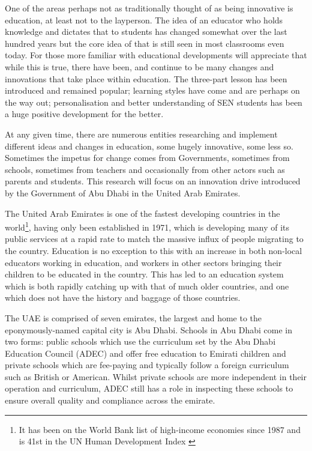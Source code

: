 One of the areas perhaps not as traditionally thought of as being innovative is education, at least not to the layperson. The idea of an educator who holds knowledge and dictates that to students has changed somewhat over the last hundred years but the core idea of that is still seen in most classrooms even today. For those more familiar with educational developments will appreciate that while this is true, there have been, and continue to be many changes and innovations that take place within education. The three-part lesson has been introduced and remained popular; learning styles have come and are perhaps on the way out; personalisation and better understanding of SEN students has been a huge positive development for the better.

At any given time, there are numerous entities researching and implement different ideas and changes in education, some hugely innovative, some less so. Sometimes the impetus for change comes from Governments, sometimes from schools, sometimes from teachers and occasionally from other actors such as parents and students. This research will focus on an innovation drive introduced by the Government of Abu Dhabi in the United Arab Emirates.

The United Arab Emirates is one of the fastest developing countries in the world\footnote{It has been on the World Bank list of high-income economies since 1987 \cite{worldbank} and is 41st in the UN Human Development Index \cite{WorkforHumanDevelopment2015}}, having only been established in 1971, which is developing many of its public services at a rapid rate to match the massive influx of people migrating to the country. Education is no exception to this with an increase in both non-local educators working in education, and workers in other sectors bringing their children to be educated in the country. This has led to an education system which is both rapidly catching up with that of much older countries, and one which does not have the history and baggage of those countries. 

The UAE is comprised of seven emirates, the largest and home to the eponymously-named capital city is Abu Dhabi. Schools in Abu Dhabi come in two forms: public schools which use the curriculum set by the Abu Dhabi Education Council (ADEC) and offer free education to Emirati children and private schools which are fee-paying and typically follow a foreign curriculum such as British or American. Whilst private schools are more independent in their operation and curriculum, ADEC still has a role in inspecting these schools to ensure overall quality and compliance across the emirate.

